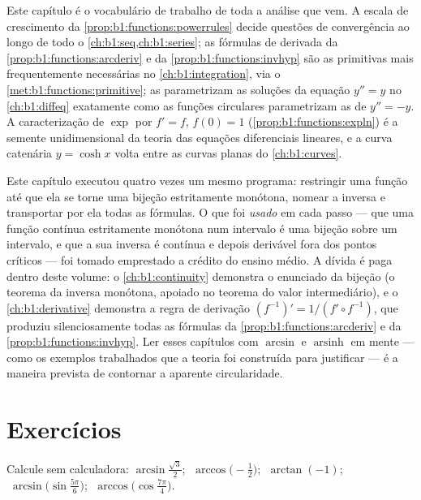 \begin{remark}\label{rem:b1:functions:whereused}
Este capítulo é o vocabulário de trabalho de toda a análise que vem.
A escala de crescimento da \cref{prop:b1:functions:powerrules} decide
questões de convergência ao longo de todo o \cref{ch:b1:seq,ch:b1:series}; as
fórmulas de derivada da \cref{prop:b1:functions:arcderiv} e da
\cref{prop:b1:functions:invhyp} são as primitivas mais frequentemente
necessárias no \cref{ch:b1:integration}, via o
\cref{met:b1:functions:primitive}; as 
parametrizam as soluções da equação $y'' = y$ no
\cref{ch:b1:diffeq} exatamente como as funções circulares parametrizam
as de $y'' = -y$. A caracterização de $\exp$ por $f' = f$,
$f(0) = 1$ (\cref{prop:b1:functions:expln}) é a semente
unidimensional da teoria das equações diferenciais lineares, e a
curva catenária $y = \cosh x$ volta entre as curvas planas do
\cref{ch:b1:curves}.
\end{remark}

\begin{remark}\label{rem:b1:functions:interlude}
Este capítulo executou quatro vezes um mesmo programa: restringir uma
função até que ela se torne uma bijeção estritamente monótona, nomear a
inversa e transportar por ela todas as fórmulas. O que foi \emph{usado}
em cada passo --- que uma função contínua estritamente monótona num
intervalo é uma bijeção sobre um intervalo, e que a sua inversa é
contínua e depois derivável fora dos pontos críticos --- foi tomado
emprestado a crédito do ensino médio. A dívida é paga dentro deste
volume: o \cref{ch:b1:continuity} demonstra o enunciado da bijeção
(o teorema da inversa monótona, apoiado no teorema do valor
intermediário), e o \cref{ch:b1:derivative} demonstra a regra de derivação
$(f^{-1})' = 1/(f' \circ f^{-1})$, que produziu silenciosamente todas as
fórmulas da \cref{prop:b1:functions:arcderiv} e da
\cref{prop:b1:functions:invhyp}. Ler esses capítulos com
$\arcsin$ e $\operatorname{arsinh}$ em mente --- como os exemplos
trabalhados que a teoria foi construída para justificar --- é a maneira
prevista de contornar a aparente circularidade.
\end{remark}

\section{Exercícios}

\begin{exercise}[$\star$]\label{exo:b1:functions:1}
Calcule sem calculadora: $\arcsin\frac{\sqrt 3}{2}$;
$\;\arccos\bigl(-\frac 12\bigr)$; $\;\arctan(-1)$;
$\;\arcsin\bigl(\sin\frac{5\pi}{6}\bigr)$;
$\;\arccos\bigl(\cos\frac{7\pi}{4}\bigr)$.
\end{exercise}

